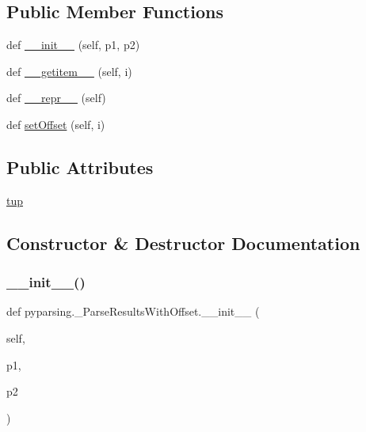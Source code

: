 \subsection*{Public Member Functions}
\begin{DoxyCompactItemize}
\item 
def \hyperlink{classpyparsing_1_1__ParseResultsWithOffset_ab0b0dd3161fcfb594af0334dcb19e73a}{\+\_\+\+\_\+init\+\_\+\+\_\+} (self, p1, p2)
\item 
def \hyperlink{classpyparsing_1_1__ParseResultsWithOffset_a58b5abf36cfe9be7f3ac1e6342a6b952}{\+\_\+\+\_\+getitem\+\_\+\+\_\+} (self, i)
\item 
def \hyperlink{classpyparsing_1_1__ParseResultsWithOffset_acc5ecf9d39d62b87dbc7962420175954}{\+\_\+\+\_\+repr\+\_\+\+\_\+} (self)
\item 
def \hyperlink{classpyparsing_1_1__ParseResultsWithOffset_ac92320f55629b0e980b3054538583d47}{set\+Offset} (self, i)
\end{DoxyCompactItemize}
\subsection*{Public Attributes}
\begin{DoxyCompactItemize}
\item 
\hyperlink{classpyparsing_1_1__ParseResultsWithOffset_ab392daf3e9d05b243265c56d310a24ca}{tup}
\end{DoxyCompactItemize}


\subsection{Constructor \& Destructor Documentation}
\mbox{\label{classpyparsing_1_1__ParseResultsWithOffset_ab0b0dd3161fcfb594af0334dcb19e73a}} 
\subsubsection{\texorpdfstring{\+\_\+\+\_\+init\+\_\+\+\_\+()}{\_\_init\_\_()}}
{\footnotesize\ttfamily def pyparsing.\+\_\+\+Parse\+Results\+With\+Offset.\+\_\+\+\_\+init\+\_\+\+\_\+ (\begin{DoxyParamCaption}\item[{}]{self,  }\item[{}]{p1,  }\item[{}]{p2 }\end{DoxyParamCaption})}



